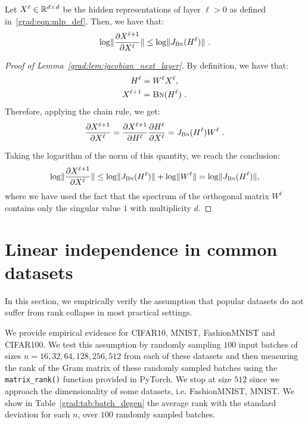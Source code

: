 \begin{lemma}
    \label{grad:lem:jacobian_next_layer}
    Let $X^\ell \in \mathbb{R}^{d \times d}$ be the hidden representations of layer $\ell > 0$ as defined in~\eqref{grad:eqn:mlp_def}. Then, we have that:
    \begin{align}
        \log \lVert\frac{\partial X^{\ell+1}}{\partial X^\ell}\rVert \leq \log \lVert J_{\text{\sc{Bn}}}(H^\ell)\rVert~.
    \end{align}
\end{lemma}
%
\begin{proof}[Proof of Lemma~\ref{grad:lem:jacobian_next_layer}]
    By definition, we have that:
    \begin{align}
        H^\ell &= W^\ell X^\ell, \\
        X^{\ell + 1} &= \text{\sc{Bn}}(H^\ell)~.
    \end{align}
    Therefore, applying the chain rule, we get:
    \begin{align}
        \frac{\partial X^{\ell+1}}{\partial X^\ell} = \frac{\partial X^{\ell+1}}{\partial H^\ell} \frac{\partial H^\ell}{\partial X^\ell} 
        = J_{\text{\sc{Bn}}}(H^\ell) W^\ell~.
    \end{align}

    Taking the logarithm of the norm of this quantity, we reach the conclusion:
    \begin{align}
        \log \lVert\frac{\partial X^{\ell+1}}{\partial X^\ell}\rVert
        \leq \log \lVert J_{\text{\sc{Bn}}}(H^\ell)\rVert + \log \lVert W^\ell\rVert 
        = \log \lVert J_{\text{\sc{Bn}}}(H^\ell)\rVert,
    \end{align}
    where we have used the fact that the spectrum of the orthogonal matrix $W^\ell$ contains only the singular value $1$ with multiplicity $d$.
\end{proof}


\section{Linear independence in common datasets}
\label{grad:sec:datasets_independence}
In this section, we empirically verify the assumption that popular datasets do not suffer from rank collapse in most practical settings.

We provide empirical evidence for CIFAR10, MNIST, FashionMNIST and CIFAR100. We test this assumption by randomly sampling $100$ input batches of sizes $n=16, 32, 64, 128, 256, 512$ from each of these datasets and then measuring the rank of the Gram matrix of these randomly sampled batches using the \texttt{matrix\_rank()} function provided in PyTorch. We stop at size $512$ since we approach the dimensionality of some datasets, i.e. FashionMNIST, MNIST. We show in Table~\ref{grad:tab:batch_degen} the average rank with the standard deviation for each $n$, over $100$ randomly sampled batches. 



